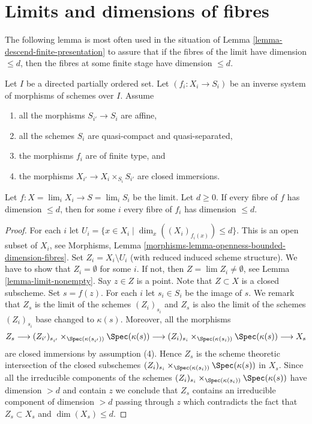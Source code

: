 \section{Limits and dimensions of fibres}
\label{section-limits-dimension}

\noindent
The following lemma is most often used in the situation of
Lemma \ref{lemma-descend-finite-presentation}
to assure that if the fibres of the limit have dimension $\leq d$,
then the fibres at some finite stage have dimension $\leq d$.

\begin{lemma}
\label{lemma-limit-dimension}
Let $I$ be a directed partially ordered set.
Let $(f_i : X_i \to S_i)$ be an inverse system of morphisms of schemes
over $I$. Assume
\begin{enumerate}
\item all the morphisms $S_{i'} \to S_i$ are affine,
\item all the schemes $S_i$ are quasi-compact and quasi-separated,
\item the morphisms $f_i$ are of finite type, and
\item the morphisms $X_{i'} \to X_i \times_{S_i} S_{i'}$ are closed
immersions.
\end{enumerate}
Let $f : X = \lim_i X_i \to S = \lim_i S_i$ be the limit.
Let $d \geq 0$.
If every fibre of $f$ has dimension $\leq d$, then for some $i$
every fibre of $f_i$ has dimension $\leq d$.
\end{lemma}

\begin{proof}
For each $i$ let $U_i = \{x \in X_i \mid \dim_x((X_i)_{f_i(x)}) \leq d\}$.
This is an open subset of $X_i$, see
Morphisms, Lemma \ref{morphisms-lemma-openness-bounded-dimension-fibres}.
Set $Z_i = X_i \setminus U_i$ (with reduced induced scheme structure).
We have to show that $Z_i = \emptyset$ for some $i$.
If not, then $Z = \lim Z_i \not = \emptyset$, see
Lemma \ref{lemma-limit-nonempty}.
Say $z \in Z$ is a point. Note that $Z \subset X$ is a closed subscheme.
Set $s = f(z)$. For each $i$ let $s_i \in S_i$ be the image
of $s$. We remark that $Z_s$ is the limit of the schemes $(Z_i)_{s_i}$
and $Z_s$ is also the limit of the schemes $(Z_i)_{s_i}$ base
changed to $\kappa(s)$. Moreover, all the morphisms
$$
Z_s
\longrightarrow
(Z_{i'})_{s_{i'}} \times_{\Spec(\kappa(s_{i'}))} \Spec(\kappa(s))
\longrightarrow
(Z_i)_{s_i} \times_{\Spec(\kappa(s_i))} \Spec(\kappa(s))
\longrightarrow
X_s
$$
are closed immersions by assumption (4). Hence $Z_s$ is the scheme
theoretic intersection of the closed subschemes
$(Z_i)_{s_i} \times_{\Spec(\kappa(s_i))} \Spec(\kappa(s))$
in $X_s$. Since all the irreducible components of the schemes
$(Z_i)_{s_i} \times_{\Spec(\kappa(s_i))} \Spec(\kappa(s))$
have dimension $> d$ and contain $z$ we conclude that
$Z_s$ contains an irreducible component of dimension $> d$ passing
through $z$ which contradicts the fact that $Z_s \subset X_s$ and
$\dim(X_s) \leq d$.
\end{proof}

